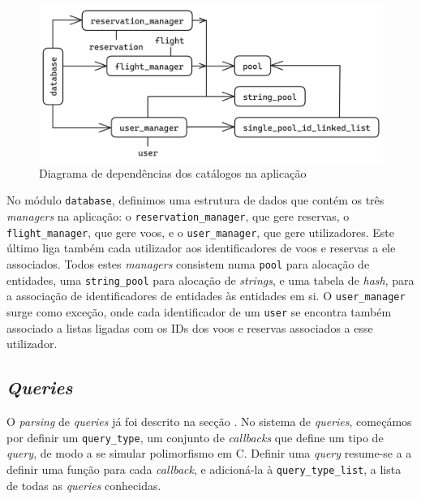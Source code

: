 \documentclass[12pt, a4paper]{article}
\begin{document}
\begin{figure}[ht]
    \centering
    \includegraphics[scale=0.2]{res/database.png}
    \caption{Diagrama de dependências dos catálogos na aplicação}
    \label{fig:catalogs}
\end{figure}

No módulo \texttt{database}, definimos uma estrutura de dados que contém os três \emph{managers} na
aplicação: o \texttt{reservation\_manager}, que gere reservas, o \texttt{flight\_manager}, que gere
voos, e o \texttt{user\_manager}, que gere utilizadores. Este último liga também cada utilizador aos
identificadores de voos e reservas a ele associados. Todos estes \emph{managers} consistem numa
\texttt{pool} para alocação de entidades, uma \texttt{string\_pool} para alocação de \emph{strings},
e uma tabela de \emph{hash}, para a associação de identificadores de entidades às entidades em si.
O \texttt{user\_manager} surge como exceção, onde cada identificador de um \texttt{user} se
encontra também associado a listas ligadas com os IDs dos voos e reservas associados a esse
utilizador.

\subsection{\emph{Queries}}
\label{sec:queries}

O \emph{parsing} de \emph{queries} já foi descrito na secção . No sistema de
\emph{queries}, começámos por definir um \texttt{query\_type}, um conjunto de \emph{callbacks} que
define um tipo de \emph{query}, de modo a se simular polimorfismo em C. Definir uma \emph{query}
resume-se a a definir uma função para cada \emph{callback}, e adicioná-la à
\texttt{query\_type\_list}, a lista de todas as \emph{queries} conhecidas.
\end{document}
